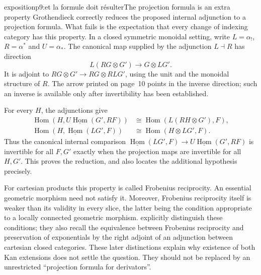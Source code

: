\begin{dcomment}{exposition}{p9:et la formule doit résulter}{The projection formula is an extra property}
Grothendieck correctly reduces the proposed internal adjunction to a projection formula. What fails is the expectation that every change of indexing category has this property. In a closed symmetric monoidal setting, write $L=\alpha_!$, $R=\alpha^*$ and $U=\alpha_*$. The canonical map supplied by the adjunction $L\dashv R$ has direction
\[
 L(RG\otimes G')\longrightarrow G\otimes LG'.
\]
It is adjoint to $RG\otimes G'\to RG\otimes RLG'$, using the unit and the monoidal structure of $R$. The arrow printed on page~10 points in the inverse direction; such an inverse is available only after invertibility has been established.

For every $H$, the adjunctions give
\[
\begin{aligned}
 \operatorname{Hom}(H,U\underline{\operatorname{Hom}}(G',RF))
 &\cong\operatorname{Hom}(L(RH\otimes G'),F),\\
 \operatorname{Hom}(H,\underline{\operatorname{Hom}}(LG',F))
 &\cong\operatorname{Hom}(H\otimes LG',F).
\end{aligned}
\]
Thus the canonical internal comparison
$\underline{\operatorname{Hom}}(LG',F)\to
U\underline{\operatorname{Hom}}(G',RF)$
is invertible for all $F,G'$ exactly when the projection maps are invertible for all $H,G'$. This proves the reduction, and also locates the additional hypothesis precisely.

For cartesian products this property is called Frobenius reciprocity. An essential geometric morphism need not satisfy it. Moreover, Frobenius reciprocity itself is weaker than its validity in every slice, the latter being the condition appropriate to a locally connected geometric morphism. \citet[\S1]{GarnerStreicher2021} explicitly distinguish these conditions; they also recall the equivalence between Frobenius reciprocity and preservation of exponentials by the right adjoint of an adjunction between cartesian closed categories. These later distinctions explain why existence of both Kan extensions does not settle the question. They should not be replaced by an unrestricted ``projection formula for derivators''.
\end{dcomment}

